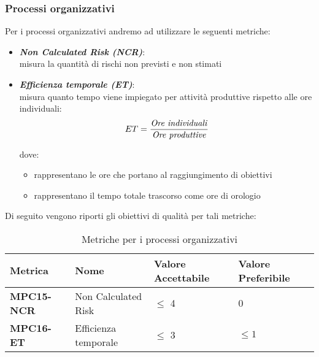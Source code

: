 \subsubsection{Processi organizzativi}
Per i processi organizzativi andremo ad utilizzare le seguenti metriche:
\begin{itemize}
    \item \textbf{\emph{Non Calculated Risk (NCR)}}:\\
    misura la quantità di rischi non previsti e non stimati
    \item \textbf{\emph{Efficienza temporale (ET)}}:\\
    misura quanto tempo viene impiegato per attività produttive rispetto alle ore individuali:
    \[
    ET = \frac{\text{\emph{Ore individuali}}}{\text{\emph{{Ore produttive}}}}
    \]

    dove:
    \begin{itemize}
        \item {} rappresentano le ore che portano al raggiungimento di obiettivi
        \item {} rappresentano il tempo totale trascorso come ore di orologio
    \end{itemize}
    \end{itemize}
Di seguito vengono riporti gli obiettivi di qualità per tali metriche:
\begin{table}[htbp]
    \centering
    \begin{tabular}{|>{\centering\arraybackslash}p{4cm}|p{4cm}|p{4cm}|p{4cm}|}
    \hline
    \rowcolor{gray!30}
    \textbf{Metrica} & \textbf{Nome} & \textbf{Valore Accettabile} & \textbf{Valore Preferibile} \\
    \hline
    \rowcolor{gray!10}
    \textbf{MPC15-NCR} & Non Calculated Risk & $\leq$ 4 & 0 \\
    \hline
    \rowcolor{gray!10}
    \textbf{MPC16-ET} & Efficienza temporale & $\leq$ 3 & $\leq 1$ \\
    \hline
    \end{tabular}
    \caption{Metriche per i processi organizzativi}
    \label{tab:metriche_fornitura}
\end{table}


